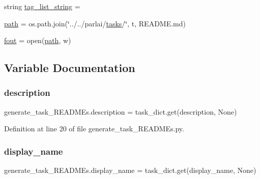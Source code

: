 \begin{DoxyCompactItemize}
\item 
string \hyperlink{namespacegenerate__task__READMEs_a7b092bf14e09c4d0daeb749f1a42eecb}{tag\+\_\+list\+\_\+string} = \textquotesingle{}\textquotesingle{}
\item 
\hyperlink{namespacegenerate__task__READMEs_ae2eccad91867a8cb484ed9d5d92187e1}{path} = os.\+path.\+join(\char`\"{}../../parlai/\hyperlink{namespacegenerate__task__READMEs_a8f4da8ba04584af52e0e9e2f209245c2}{tasks}/\char`\"{}, t, \textquotesingle{}R\+E\+A\+D\+M\+E.\+md\textquotesingle{})
\item 
\hyperlink{namespacegenerate__task__READMEs_a5ee0f93b9dd3539a16bd60d77a2a87a4}{fout} = open(\hyperlink{namespacegenerate__task__READMEs_ae2eccad91867a8cb484ed9d5d92187e1}{path}, \textquotesingle{}w\textquotesingle{})
\end{DoxyCompactItemize}


\subsection{Variable Documentation}
\mbox{\label{namespacegenerate__task__READMEs_a1fa3d286642336f46142b43041428763}} 
\subsubsection{\texorpdfstring{description}{description}}
{\footnotesize\ttfamily generate\+\_\+task\+\_\+\+R\+E\+A\+D\+M\+Es.\+description = task\+\_\+dict.\+get(\textquotesingle{}description\textquotesingle{}, None)}



Definition at line 20 of file generate\+\_\+task\+\_\+\+R\+E\+A\+D\+M\+Es.\+py.

\mbox{\label{namespacegenerate__task__READMEs_ae22075b887eb68b5bfef641a5deb2200}} 
\subsubsection{\texorpdfstring{display\+\_\+name}{display\_name}}
{\footnotesize\ttfamily generate\+\_\+task\+\_\+\+R\+E\+A\+D\+M\+Es.\+display\+\_\+name = task\+\_\+dict.\+get(\textquotesingle{}display\+\_\+name\textquotesingle{}, None)}



